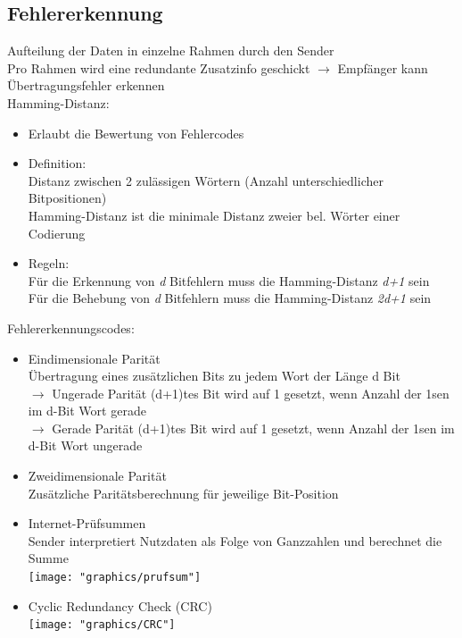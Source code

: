 \documentclass{scrreprt}
\begin{document}
\subsection{Fehlererkennung}
Aufteilung der Daten in einzelne Rahmen durch den Sender
\\Pro Rahmen wird eine redundante Zusatzinfo geschickt $\rightarrow$ Empfänger kann Übertragungsfehler erkennen
\\Hamming-Distanz:
\begin{itemize}
	\item Erlaubt die Bewertung von Fehlercodes
	\item Definition:
	\\Distanz zwischen 2 zulässigen Wörtern (Anzahl unterschiedlicher Bitpositionen)
	\\Hamming-Distanz ist die minimale Distanz zweier bel. Wörter einer Codierung
	\item Regeln:
	\\Für die Erkennung von \textit{d} Bitfehlern muss die Hamming-Distanz \textit{d+1} sein
	\\Für die Behebung von \textit{d} Bitfehlern muss die Hamming-Distanz \textit{2d+1} sein
\end{itemize}
Fehlererkennungscodes:
\begin{itemize}
	\item Eindimensionale Parität
	\\Übertragung eines zusätzlichen Bits zu jedem Wort der Länge d Bit
	\\$\rightarrow$ Ungerade Parität (d+1)tes Bit wird auf 1 gesetzt, wenn Anzahl der 1sen im d-Bit Wort gerade
	\\$\rightarrow$ Gerade Parität (d+1)tes Bit wird auf 1 gesetzt, wenn Anzahl der 1sen im d-Bit Wort ungerade
	\item Zweidimensionale Parität
	\\Zusätzliche Paritätsberechnung für jeweilige Bit-Position
	\item Internet-Prüfsummen
	\\ Sender interpretiert Nutzdaten als Folge von Ganzzahlen und berechnet die Summe
	\\\texttt{[image: "graphics/prufsum"]}
	\item Cyclic Redundancy Check (CRC)
	\\\texttt{[image: "graphics/CRC"]}
\end{itemize}
\end{document}

